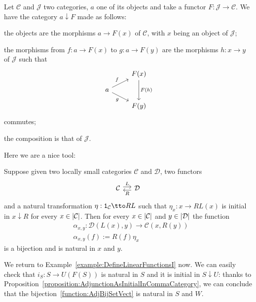 \begin{construction}
  Let \(\mathcal{C}\) and \(\mathcal{J}\) two categories, \(a\) one of its objects
  and take a functor \(F : \mathcal{J} \to \mathcal{C}\). We have the category
  \(a {\downarrow} F\) made as follows:
  \begin{tcbitem}
  \item the objects are the morphisms \(a \to F(x)\) of \(\mathcal{C}\), with
    \(x\) being an object of \(\mathcal{J}\);
  \item the morphisms from \(f : a \to F(x)\) to \(g : a \to F(y)\) are
    the morphisms \(h : x \to y\) of \(\mathcal{J}\) such that
    \[\begin{tikzcd}[row sep=small]
        & F(x) \ar["{F(h)}", dd] \\
        a \ar["f", ur] \ar["g", dr, swap] \\
        & F(y)
      \end{tikzcd}\] commutes;
  \item the composition is that of \(\mathcal{J}\).
  \end{tcbitem}
\end{construction}

Here we are a nice tool:

\begin{proposition}\label{proposition:AdjunctionAsInitialInCommaCategory}
  Suppose given two locally small categories \(\mathcal{C}\) and \(\mathcal{D}\),
  two functors
  \[
    \begin{tikzcd}[column sep=small]
      \mathcal{C} \ar["L", r, shift left] & \mathcal{D} \ar["R", l, shift left]
    \end{tikzcd}
  \]
  and a natural transformation \(\eta : \id_{\mathcal{C}} \tto RL\) such that
  \(\eta_x : x \to RL(x)\) is initial in \(x {\downarrow} R\) for every
  \(x \in \left\lvert\mathcal{C}\right\rvert\). Then for every \(x \in \left\lvert\mathcal{C}\right\rvert\) and
  \(y \in \left\lvert\mathcal{D}\right\rvert\) the function
  \begin{align*}
    & \alpha_{x,y} : \mathcal{D}(L(x), y) \to \mathcal{C}(x, R(y)) \\
    & \alpha_{x,y}(f) := R(f)\eta_x
  \end{align*}
  is a bijection and is natural in \(x\) and \(y\).
\end{proposition}

\begin{example}
  We return to Example~\ref{example:DefineLinearFunctionsI} now. We can
  easily check that \(i_S : S \to U(F(S))\) is natural in \(S\) and it is
  initial in \(S{\downarrow} U\): thanks to
  Proposition~\ref{proposition:AdjunctionAsInitialInCommaCategory}, we
  can conclude that the bijection~\eqref{function:AdjBijSetVect} is
  natural in \(S\) and \(W\).
\end{example}


